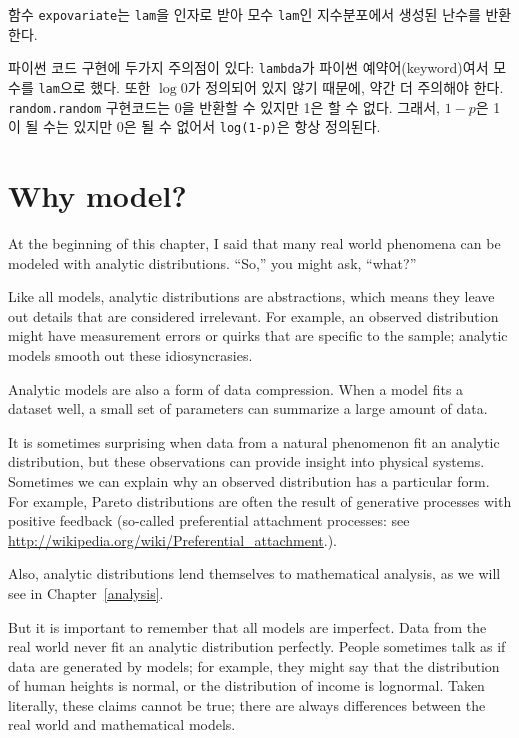 함수 {\tt expovariate}는 {\tt lam}을 인자로 받아
모수 {\tt lam}인 지수분포에서 생성된 난수를 반환한다.

파이썬 코드 구현에 두가지 주의점이 있다: 
\verb"lambda"가 파이썬 예약어(keyword)여서 모수를 \verb"lam"으로 했다. 또한 $\log 0$가 정의되어 있지 않기 때문에, 약간 더 주의해야 한다.
{\tt random.random} 구현코드는 0을 반환할 수 있지만 1은 할 수 없다.
그래서, $1 - p$은 1이 될 수는 있지만 0은 될 수 없어서 {\tt log(1-p)}은 항상 정의된다. 


\section{Why model?}

At the beginning of this chapter, I said that many real world phenomena
can be modeled with analytic distributions.  ``So,'' you might ask,
``what?''  

Like all models, analytic distributions are abstractions, which
means they leave out details that are considered irrelevant.
For example, an observed distribution might have measurement errors
or quirks that are specific to the sample; analytic models smooth
out these idiosyncrasies.

Analytic models are also a form of data compression.  When a model
fits a dataset well, a small set of parameters can summarize a
large amount of data.

It is sometimes surprising when data from a natural phenomenon fit an
analytic distribution, but these observations can provide insight
into physical systems.  Sometimes we can explain why an observed
distribution has a particular form.  For example, Pareto distributions
are often the result of generative processes with positive feedback
(so-called preferential attachment processes: see
\url{http://wikipedia.org/wiki/Preferential_attachment}.).

Also, analytic distributions lend themselves to mathematical
analysis, as we will see in Chapter~\ref{analysis}.

But it is important to remember that all models are imperfect.
Data from the real world never fit an analytic distribution perfectly.
People sometimes talk as if data are generated by models; for example,
they might say that the distribution of human heights is normal,
or the distribution of income is lognormal.  Taken literally, these
claims cannot be true; there are always differences between the
real world and mathematical models.

